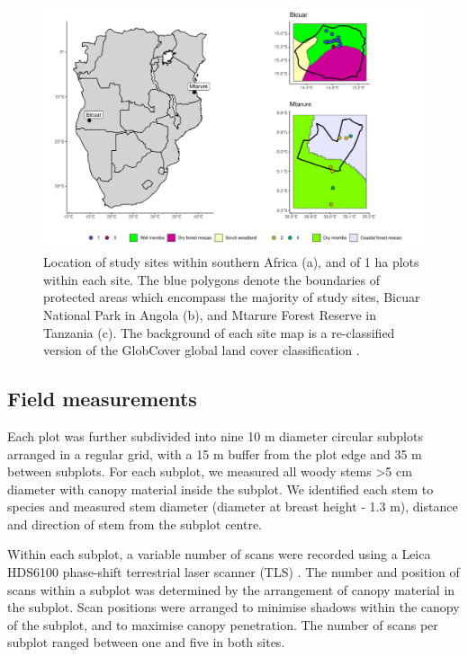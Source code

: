 \documentclass[11pt,a4paper]{article}
\begin{document}
\begin{figure}[H]
\centering
	\includegraphics[width=\textwidth]{map}
	\caption{Location of study sites within southern Africa (a), and of 1 ha plots within each site. The blue polygons denote the boundaries of protected areas which encompass the majority of study sites, Bicuar National Park in Angola (b), and Mtarure Forest Reserve in Tanzania (c). The background of each site map is a re-classified version of the GlobCover global land cover classification \citep{Globcover}.}
	\label{map}
\end{figure}

\subsection{Field measurements}

Each plot was further subdivided into nine 10 m diameter circular subplots arranged in a regular grid, with a 15 m buffer from the plot edge and 35 m between subplots. For each subplot, we measured all woody stems >5 cm diameter with canopy material inside the subplot. We identified each stem to species and measured stem diameter (diameter at breast height - 1.3 m), distance and direction of stem from the subplot centre.

Within each subplot, a variable number of scans were recorded using a Leica HDS6100 phase-shift terrestrial laser scanner (TLS) \citep{Leica}. The number and position of scans within a subplot was determined by the arrangement of canopy material in the subplot. Scan positions were arranged to minimise shadows within the canopy of the subplot, and to maximise canopy penetration. The number of scans per subplot ranged between one and five in both sites. 
\end{document}
